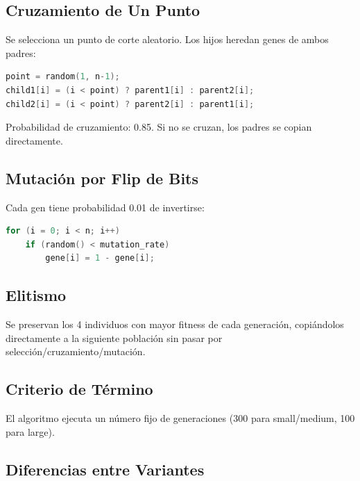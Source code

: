\documentclass[12pt,a4paper]{article}
\begin{document}
\subsection{Cruzamiento de Un Punto}

Se selecciona un punto de corte aleatorio. Los hijos heredan genes de ambos padres:

\begin{lstlisting}[language=C++]
point = random(1, n-1);
child1[i] = (i < point) ? parent1[i] : parent2[i];
child2[i] = (i < point) ? parent2[i] : parent1[i];
\end{lstlisting}

Probabilidad de cruzamiento: 0.85. Si no se cruzan, los padres se copian directamente.

\subsection{Mutaci\'on por Flip de Bits}

Cada gen tiene probabilidad 0.01 de invertirse:

\begin{lstlisting}[language=C++]
for (i = 0; i < n; i++)
    if (random() < mutation_rate)
        gene[i] = 1 - gene[i];
\end{lstlisting}

\subsection{Elitismo}

Se preservan los 4 individuos con mayor fitness de cada generaci\'on, copi\'andolos directamente a la siguiente poblaci\'on sin pasar por selecci\'on/cruzamiento/mutaci\'on.

\subsection{Criterio de T\'ermino}

El algoritmo ejecuta un n\'umero fijo de generaciones (300 para small/medium, 100 para large).

\subsection{Diferencias entre Variantes}
\end{document}

